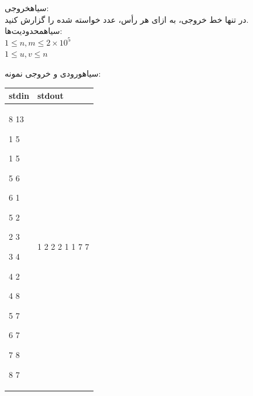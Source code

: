\noindent
{}‌سیاه{خروجی:}\\
در تنها خط خروجی، به ازای هر رأس، عدد خواسته شده را گزارش کنید.\\
‌سیاه{محدودیت‌ها:}\\
$1\leq n,m\leq 2\times10^5$\\
$1\leq u,v \leq n$

‌سیاه{ورودی و خروجی نمونه:}\\
\begin{latin}
	\begin{tabularx}{\textwidth}{|X | X|}
		\hline
		\textbf{stdin} &
		\textbf{stdout}\\
		\hline
		8 13
		
		1 5
		
		1 5
		
		5 6
		
		6 1
		
		5 2
		
		2 3
		
		3 4
		
		4 2
		
		4 8
		
		5 7
		
		6 7
		
		7 8
		
		8 7&
		1 2 2 2 1 1 7 7\\
		\hline
		
	\end{tabularx}
\end{latin}







